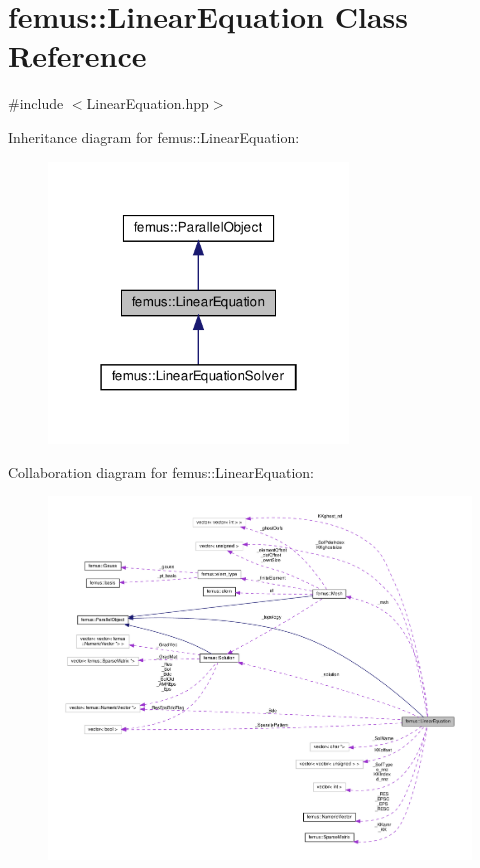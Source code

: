 \hypertarget{classfemus_1_1_linear_equation}{}\section{femus\+:\+:Linear\+Equation Class Reference}
\label{classfemus_1_1_linear_equation}


{\ttfamily \#include $<$Linear\+Equation.\+hpp$>$}



Inheritance diagram for femus\+:\+:Linear\+Equation\+:
\nopagebreak
\begin{figure}[H]
\begin{center}
\leavevmode
\includegraphics[width=226pt]{classfemus_1_1_linear_equation__inherit__graph}
\end{center}
\end{figure}


Collaboration diagram for femus\+:\+:Linear\+Equation\+:
\nopagebreak
\begin{figure}[H]
\begin{center}
\leavevmode
\includegraphics[width=350pt]{classfemus_1_1_linear_equation__coll__graph}
\end{center}
\end{figure}
